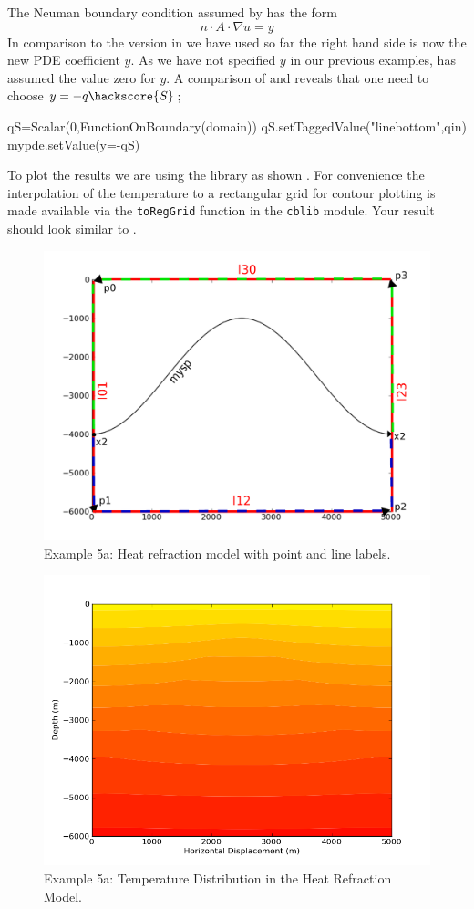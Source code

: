 The Neuman boundary condition assumed by \esc has the form
\begin{equation}\label{NEUMAN 2b}
n\cdot A \cdot\nabla u = y 
\end{equation}
In comparison to the version in  we have used so far the right
hand side is now 
the new PDE coefficient $y$. As we have not specified $y$ in our previous
examples, \esc has assumed
the value zero for $y$. A comparison of  and  reveals that one need to
choose $y=-q\hackscore{S}$;
\begin{python}
qS=Scalar(0,FunctionOnBoundary(domain))
qS.setTaggedValue("linebottom",qin)
mypde.setValue(y=-qS)
\end{python}
To plot the results we are using the \modmpl library as shown . For convenience
the interpolation of the temperature to a rectangular grid for contour plotting
is made available
via the \verb|toRegGrid| function in the \verb|cblib| module. Your result should
look similar to 
.

\begin{figure}[ht]
\centerline{\includegraphics[width=4.in]{figures/anticlineheatrefraction}}
\caption{Example 5a: Heat refraction model with point and line labels.}
\label{fig:anticlinehrmodel}
\end{figure}

\begin{figure}[ht]
\centerline{\includegraphics[width=4.in]{figures/heatrefraction}}
\caption{Example 5a: Temperature Distribution in the Heat Refraction Model.}
\label{fig:anticlinetemp}
\end{figure}

